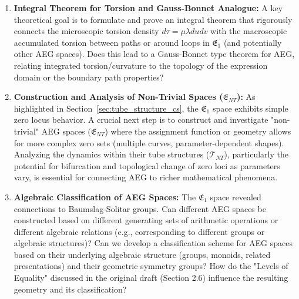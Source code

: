 \documentclass[12pt]{article}
\begin{document}
\begin{enumerate}[label=\textbf{F\arabic*.}, leftmargin=*, widest=F6, align=left]
    \item \textbf{Integral Theorem for Torsion and Gauss-Bonnet Analogue:} A key theoretical goal is to formulate and prove an integral theorem that rigorously connects the microscopic torsion density \( d\tau = \mu \lambda du dv \) with the macroscopic accumulated torsion between paths or around loops in \( \mathfrak{E}_1 \) (and potentially other AEG spaces). Does this lead to a Gauss-Bonnet type theorem for AEG, relating integrated torsion/curvature to the topology of the expression domain or the boundary path properties?

    \item \textbf{Construction and Analysis of Non-Trivial Spaces (\( \mathfrak{E}_{NT} \)):} As highlighted in Section~\ref{sec:tube_structure_cs}, the \( \mathfrak{E}_1 \) space exhibits simple zero locus behavior. A crucial next step is to construct and investigate "non-trivial" AEG spaces (\( \mathfrak{E}_{NT} \)) where the assignment function or geometry allows for more complex zero sets (multiple curves, parameter-dependent shapes). Analyzing the dynamics within their tube structures (\( \mathcal{T}_{NT} \)), particularly the potential for bifurcation and topological change of zero loci as parameters vary, is essential for connecting AEG to richer mathematical phenomena.

    \item \textbf{Algebraic Classification of AEG Spaces:} The \( \mathfrak{E}_1 \) space revealed connections to Baumslag-Solitar groups. Can different AEG spaces be constructed based on different generating sets of arithmetic operations or different algebraic relations (e.g., corresponding to different groups or algebraic structures)? Can we develop a classification scheme for AEG spaces based on their underlying algebraic structure (groups, monoids, related presentations) and their geometric symmetry groups? How do the "Levels of Equality" discussed in the original draft (Section 2.6) influence the resulting geometry and its classification?


\end{enumerate}
\end{document}
